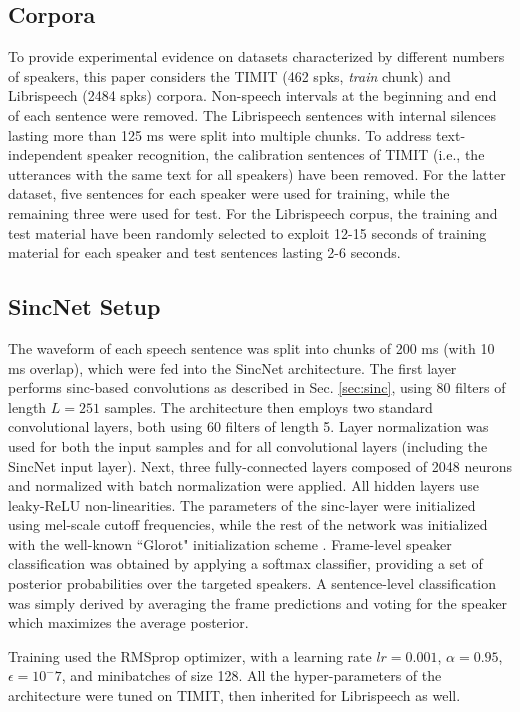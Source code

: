 \documentclass{article}
\begin{document}
\subsection{Corpora}
To provide experimental evidence on datasets characterized by different numbers of speakers, this paper considers the TIMIT (462 spks, \textit{train} chunk)  \cite{timit} and Librispeech  (2484 spks) \cite{librispeech} corpora. Non-speech intervals at the beginning and end of each sentence were removed. The Librispeech sentences with internal silences lasting more than 125 ms were split into multiple chunks. To address text-independent speaker recognition, the calibration sentences of TIMIT (i.e., the utterances with the same text for all speakers) have been removed. For the latter dataset, five sentences for each speaker were used for training, while the remaining three were used for test. For the Librispeech corpus, the training and test material have been randomly selected to exploit 12-15 seconds of training material for each speaker and test sentences lasting 2-6 seconds.

\subsection{SincNet Setup}
The waveform of each speech sentence was split into chunks of 200 ms (with 10 ms overlap), which were fed into the SincNet architecture. The first layer performs sinc-based convolutions as described in Sec. \ref{sec:sinc}, using 80 filters of length $L=251$ samples. The architecture then employs two standard convolutional layers, both using 60 filters of length 5. Layer normalization \cite{layer_norm} was used for both the input samples and for all convolutional layers (including the SincNet input layer). Next, three fully-connected layers composed of 2048 neurons and normalized with batch normalization \cite{batchnorm} were applied. All hidden layers use leaky-ReLU \cite{leaky_relu} non-linearities. The parameters of the sinc-layer were initialized using mel-scale cutoff frequencies, while the rest of the network was initialized with the well-known ``Glorot" initialization scheme \cite{xavier}. Frame-level speaker classification was obtained by applying a softmax classifier, providing a set of posterior probabilities over the targeted speakers. A sentence-level classification was simply derived by averaging the frame predictions and voting for the speaker which maximizes the average posterior.

Training used the RMSprop optimizer, with a learning rate $lr=0.001$, $\alpha=0.95$, $\epsilon=10^-7$, and minibatches of size 128. %
All the hyper-parameters of the architecture were tuned on TIMIT, then inherited for Librispeech as well. %
\end{document}
